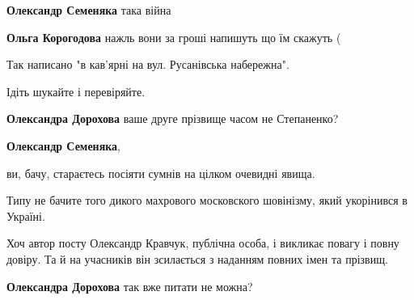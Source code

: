 \begin{itemize}
\begin{itemize}
\textbf{Олександр Семеняка} така війна

 
\textbf{Ольга Корогодова} нажль вони за гроші напишуть що їм скажуть (

 

Так написано "в кав'ярні на вул. Русанівська набережна".

Ідіть шукайте і перевіряйте.


 
\textbf{Олександра Дорохова} ваше друге прізвище часом не Степаненко?

 
\textbf{Олександр Семеняка}, 

ви, бачу, стараєтесь посіяти сумнів на цілком очевидні явища.

Типу не бачите того дикого махрового московского шовінізму, який укорінився в
Україні.

Хоч автор посту Олександр Кравчук, публічна особа, і викликає повагу і повну
довіру. Та й на учасників він зсилається з наданням повних імен та прізвищ.


 
\textbf{Олександра Дорохова} так вже питати не можна?

 

\end{itemize}
\end{itemize}
